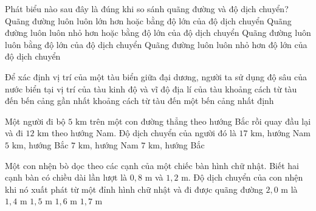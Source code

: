 \begin{ex} Phát biểu nào sau đây là đúng khi so sánh quãng đường và độ dịch chuyển?
\choice
{\True Quãng đường luôn luôn lớn hơn hoặc bằng độ lớn của độ dịch chuyển}
{Quãng đường luôn luôn nhỏ hơn hoặc bằng độ lớn của độ dịch chuyển}
{Quãng đường luôn luôn bằng độ lớn của độ dịch chuyển}
{Quãng đường luôn luôn nhỏ hơn độ lớn của độ dịch chuyển}
\end{ex}

\begin{ex} Để xác định vị trí của một tàu biển giữa đại dương, người ta sử dụng
\choice
{độ sâu của nước biển tại vị trí của tàu}
{\True kinh độ và vĩ độ địa lí của tàu}
{khoảng cách từ tàu đến bến cảng gần nhất}
{khoảng cách từ tàu đến một bến cảng nhất định}
\end{ex}

\begin{ex} Một người đi bộ $5\text{ km}$ trên một con đường thẳng theo hướng Bắc rồi quay đầu lại và đi $12\text{ km}$ theo hướng Nam. Độ dịch chuyển của người đó là
\choice
{$17\text{ km}$, hướng Nam}
{$5\text{ km}$, hướng Bắc}
{\True $7\text{ km}$, hướng Nam}
{$7\text{ km}$, hướng Bắc}
\end{ex}

\begin{ex} Một con nhện bò dọc theo các cạnh của một chiếc bàn hình chữ nhật. Biết hai cạnh bàn có chiều dài lần lượt là $0{,}8\text{ m}$ và $1{,}2\text{ m}$. Độ dịch chuyển của con nhện khi nó xuất phát từ một đỉnh hình chữ nhật và đi được quãng đường $2{,}0\text{ m}$ là
\choice
{\True $1{,}4\text{ m}$}
{$1{,}5\text{ m}$}
{$1{,}6\text{ m}$}
{$1{,}7\text{ m}$}
\end{ex}

